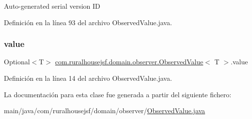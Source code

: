 Auto-\/generated serial version ID 

Definición en la línea 93 del archivo Observed\+Value.\+java.

\mbox{\label{classcom_1_1ruralhousejsf_1_1domain_1_1observer_1_1_observed_value_a7f337dfd21158b7642243b5fd1fcb877}} 
\subsubsection{\texorpdfstring{value}{value}}
{\footnotesize\ttfamily Optional$<$T$>$ \mbox{\hyperlink{classcom_1_1ruralhousejsf_1_1domain_1_1observer_1_1_observed_value}{com.\+ruralhousejsf.\+domain.\+observer.\+Observed\+Value}}$<$ T $>$.value\hspace{0.3cm}{\ttfamily [private]}}



Definición en la línea 14 del archivo Observed\+Value.\+java.



La documentación para esta clase fue generada a partir del siguiente fichero\+:\begin{DoxyCompactItemize}
\item 
main/java/com/ruralhousejsf/domain/observer/\mbox{\hyperlink{_observed_value_8java}{Observed\+Value.\+java}}\end{DoxyCompactItemize}
